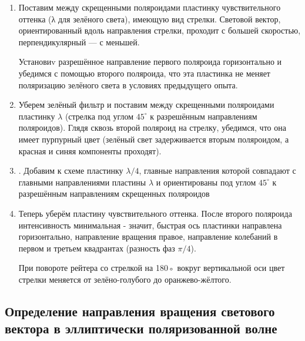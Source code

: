 \documentclass[a4paper]{article}
\begin{document}
\begin{enumerate}
    \item Поставим между скрещенными поляроидами пластинку чувствительного оттенка (λ для зелёного света), имеющую вид стрелки. Световой вектор, ориентированный вдоль направления стрелки, проходит с большей скоростью, перпендикулярный — с меньшей. \par
Установиv разрешённое направление первого поляроида горизонтально и убедимся с помощью второго поляроида, что эта пластинка
не меняет поляризацию зелёного света в условиях предыдущего опыта.

\item Уберем зелёный фильтр
и поставим между скрещенными поляроидами
пластинку $\lambda$ (стрелка под углом $45^{\circ}$ к разрешённым направлениям поляроидов).
Глядя сквозь второй поляроид на стрелку, убедимся, что она имеет пурпурный цвет (зелёный свет задерживается вторым поляроидом, а красная и синяя компоненты проходят).
\item . Добавим
к схеме пластинку $\lambda/4$, главные направления
которой совпадают с главными направлениями пластины $\lambda$ и ориентированы под
углом $45^{\circ}$ к разрешённым направлениям скрещенных поляроидов

\item Теперь уберём пластину чувствительного оттенка. После второго поляроида интенсивность минимальная - значит, быстрая ось пластинки направлена горизонтально, направление вращения правое, направление колебаний в первом и третьем квадрантах (разность фаз $\pi/4$). \par
При повороте рейтера со стрелкой на 180◦ вокруг вертикальной оси
цвет стрелки меняется от зелёно-голубого до оранжево-жёлтого.

\end{enumerate}

\subsection{Определение направления вращения светового вектора в
эллиптически поляризованной волне}
\end{document}
